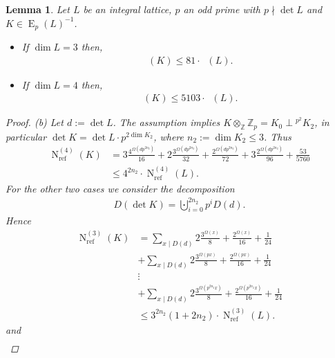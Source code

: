 \documentclass{amsart}
\newtheorem{lem}[thm]{Lemma}
\theoremstyle{definition}
\theoremstyle{remark}
\def\ZZ{\mathbb{Z}}
\DeclareMathOperator{\N}{N}
\DeclareMathOperator{\Nref}{N_{ref}}
\DeclareMathOperator{\E}{E}
\begin{document}
\begin{lem} Let $L$ be an integral lattice, $p$ an odd prime with $p \nmid \det L$ and $K \in \E_p(L)^{-1}$.
 \begin{itemize}
  \item[(a)] If $\dim L = 3$ then,       
             \begin{align*}
              \Nref(K) \leq 81 \cdot \Nref(L).
             \end{align*}             
  \item[(b)] If $\dim L = 4$ then,
             \begin{align*}
              \Nref(K) \leq 5103 \cdot \Nref(L).
             \end{align*}
 \end{itemize}
 \begin{proof}
  (b) Let $d:=\det L$. The assumption implies $K \otimes_{\ZZ} \ZZ_p = K_0 \perp {}^{p^{2}}\!{K_{2}}$, in particular $\det K = \det L \cdot p^{2\dim K_2}$, where $n_2:=\dim K_2 \leq 3$. Thus
  \begin{align*}
    \N^{(4)}_{\mathrm{ref}}(K) &=3\frac{4^{\Omega(dp^{2n_2})}}{16} + 2\frac{3^{\Omega(dp^{2n_2})}}{32} + \frac{2^{\Omega(dp^{2n_2})}}{72} 
                                              + 3\frac{2^{\Omega(dp^{2n_2})}}{96} + \frac{53}{5760} \\
                             & \leq 4^{2n_2}  \cdot \N^{(4)}_{\mathrm{ref}}(L).
  \end{align*}
 For the other two cases we consider the decomposition 
 \begin{align*}
  D(\det K) = \bigcupdot_{i=0}^{2n_2}p^i D(d).
 \end{align*}
 Hence
 \begin{align*}
   \N^{(3)}_{\mathrm{ref}}(K) &=\sum_{x \mid D(d)}2\frac{3^{\Omega(x)}}{8} + \frac{2^{\Omega(x)}}{16}+\frac{1}{24} \\
                                          &+\sum_{x \mid D(d)}2\frac{3^{\Omega(px)}}{8} + \frac{2^{\Omega(px)}}{16}+\frac{1}{24}\\
                                          & \vdots \\
                                          &+\sum_{x \mid D(d)}2\frac{3^{\Omega(p^{2n_2}x)}}{8} + \frac{2^{\Omega(p^{2n_2}x)}}{16}+\frac{1}{24}\\
                                          &\leq 3^{2n_2} (1+2n_2) \cdot \N^{(3)}_{\mathrm{ref}}(L).
 \end{align*}
 and
 \begin{align*}

\end{align*}
\end{proof}
\end{lem}
\end{document}
